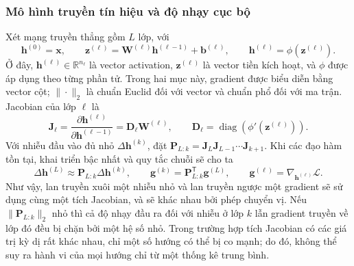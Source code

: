 \documentclass[12pt]{article}
\begin{document}
\subsubsection{Mô hình truyền tín hiệu và độ nhạy cục bộ}
Xét mạng truyền thẳng gồm $L$ lớp, với
\begin{equation}
 \mathbf h^{(0)}=\mathbf x,\qquad
 \mathbf z^{(\ell)}=\mathbf W^{(\ell)}\mathbf h^{(\ell-1)}+\mathbf b^{(\ell)},\qquad
 \mathbf h^{(\ell)}=\phi\!\left(\mathbf z^{(\ell)}\right).
 \label{eq:long-ff}
\end{equation}
Ở đây, $\mathbf h^{(\ell)}\in\mathbb R^{n_\ell}$ là vector activation, $\mathbf z^{(\ell)}$ là vector tiền kích hoạt, và $\phi$ được áp dụng theo từng phần tử. Trong hai mục này, gradient được biểu diễn bằng vector cột; $\|\cdot\|_2$ là chuẩn Euclid đối với vector và chuẩn phổ đối với ma trận. Jacobian của lớp $\ell$ là
\begin{equation}
 \mathbf J_\ell
 =\frac{\partial\mathbf h^{(\ell)}}{\partial\mathbf h^{(\ell-1)}}
 =\mathbf D_\ell\mathbf W^{(\ell)},\qquad
 \mathbf D_\ell=\operatorname{diag}\!\left(\phi'(\mathbf z^{(\ell)})\right).
 \label{eq:long-jacobian}
\end{equation}
Với nhiễu đầu vào đủ nhỏ $\Delta\mathbf h^{(k)}$, đặt
$\mathbf P_{L:k}=\mathbf J_L\mathbf J_{L-1}\cdots\mathbf J_{k+1}$. Khi các đạo hàm tồn tại, khai triển bậc nhất và quy tắc chuỗi sẽ cho ta
\begin{equation}
 \Delta\mathbf h^{(L)}\approx\mathbf P_{L:k}\Delta\mathbf h^{(k)},\qquad
 \mathbf g^{(k)}=\mathbf P_{L:k}^{\mathsf T}\mathbf g^{(L)},\qquad
 \mathbf g^{(\ell)}=\nabla_{\mathbf h^{(\ell)}}\mathcal L.
 \label{eq:long-duality}
\end{equation}
Như vậy, lan truyền xuôi một nhiễu nhỏ và lan truyền ngược một gradient sẽ sử dụng cùng một tích Jacobian, và sẽ khác nhau bởi phép chuyển vị. Nếu $\|\mathbf P_{L:k}\|_2$ nhỏ thì cả độ nhạy đầu ra đối với nhiễu ở lớp $k$ lẫn gradient truyền về lớp đó đều bị chặn bởi một hệ số nhỏ. Trong trường hợp tích Jacobian có các giá trị kỳ dị rất khác nhau, chỉ một số hướng có thể bị co mạnh; do đó, không thể suy ra hành vi của mọi hướng chỉ từ một thống kê trung bình.
\end{document}

